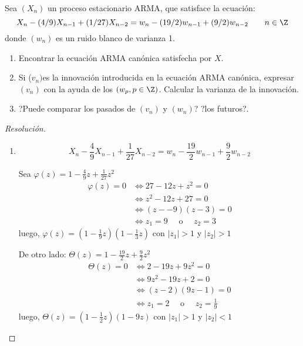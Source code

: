 \begin{ejemplo}
Sea $(X_{{n}})$ un proceso estacionario ARMA, que satisface la ecuaci\'{o}n:
\[
X_{n} -(4/9) X_{n-1} +(1/27) X_{n-2} =w_{n} -(19/2) w_{n-1} 
+(9/2) w_{n-2} \quad \quad n\in \Z
\]
donde $(w_{n})$ es un ruido blanco de varianza 1.

\begin{enumerate}
\item Encontrar la ecuaci\'{o}n ARMA can\'{o}nica satisfecha por $X$.
\item Si ($v_{n}) $es la innovaci\'{o}n introducida en la ecuaci\'{o}n ARMA can\'{o}nica, expresar $(v_{n})$ con la ayuda de los $(w_{p}, p\in \Z)$. Calcular la varianza de la innovaci\'{o}n.
\item ?Puede comparar los pasados de $(v_{n})$ y $(w_{n})$? ?los futuros?.
\end{enumerate}

\begin{proof}[Resoluci\'{o}n]
\begin{enumerate}
\item 
\begin{equation}\label{eq:ej12.1}
X_{n} -\frac{4}{9}X_{n-1} +\frac{1}{27}X_{n-2} =w_{n} 
-\frac{19}{2}w_{n-1} +\frac{9}{2}w_{n-2}  
\end{equation}

Sea $\varphi (z)=1-\frac{4}{9}z+\frac{1}{27}z^{2}$
\begin{align*}
 \varphi (z)=0
	&\Longleftrightarrow 27-12z+z^{2}=0\\
	&\Longleftrightarrow z^{2}-12 z+27=0\\
	&\Longleftrightarrow (z-- 9) (z - 3)=0\\
	&\Longleftrightarrow z_{1}= 9\quad\text{ o }\quad z_{2}= 3
\end{align*}
luego, $\varphi (z)=\left( {1-\frac{1}{9}z} \right)\left({1-\frac{1}{3}z} \right)$
con $\left| {z_{1} } \right|>1$ y $\left| {z_{2} } \right|>1$

De otro lado: $\Theta (z)=1-\frac{19}{2}z+\frac{9}{2}z^{2}$
\begin{align*}
 \Theta \left( z \right)=0
	&\Longleftrightarrow 2-19z+9z^{2}=0\\
	&\Longleftrightarrow 9 z^{2}-19 z+2=0\\
	&\Longleftrightarrow (z - 2) (9z - 1)=0\\
	&\Longleftrightarrow z_{1}= 2\quad\text{ o }\quad z_{2}=\frac{1}{9}
\end{align*}
luego, $\Theta (z)=\left( {1-\frac{1}{2}z} \right)\left( {1-9 z} \right)$ 
con $\left| {z_{1} } \right|>1$ y $\left| {z_{2} } \right|<1$


\end{enumerate}
\end{proof}
\end{ejemplo}
